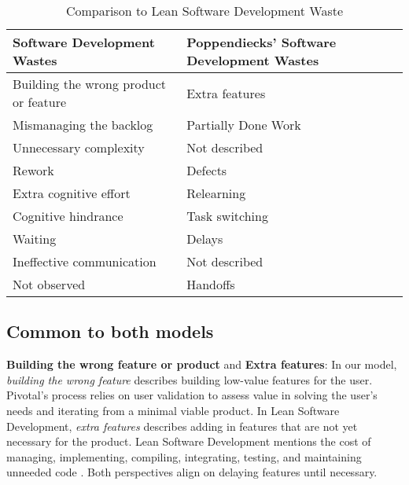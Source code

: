 \begin{table}[t]
\renewcommand{\arraystretch}{1.5}
\centering
\caption{Comparison to Lean Software Development Waste}
\label{LeanSoftwareDevelopmentComparisonTable}
\begin{tabular}{|p{1.57in}|p{1.57in}|}
\hline
Software Development Wastes           & Poppendiecks' Software Development Wastes \\ \hline
Building the wrong product or feature & Extra features                            \\ \hline
Mismanaging the backlog               & Partially Done Work                            \\ \hline
Unnecessary complexity                & Not described                             \\ \hline
Rework                                & Defects                                   \\ \hline
Extra cognitive effort          & Relearning                             \\ \hline
Cognitive hindrance           & Task switching                             \\ \hline
Waiting                               & Delays                                    \\ \hline
Ineffective communication             & Not described                             \\ \hline
Not observed                          & Handoffs                                  \\ \hline
\end{tabular}
\end{table}
\subsection{Common to both models}
\textbf{Building the wrong feature or product} and \textbf{Extra features}: In our model, \textit{building the wrong feature} describes building low-value features for the user. Pivotal's process relies on user validation to assess value in solving the user's needs and iterating from a minimal viable product. In Lean Software Development, \textit{extra features} describes adding in features that are not yet necessary for the product. Lean Software Development mentions the cost of managing, implementing, compiling, integrating, testing, and maintaining unneeded code \cite{PoppendieckLeanSoftwareDevelopment}.  Both perspectives align on delaying features until necessary. 


